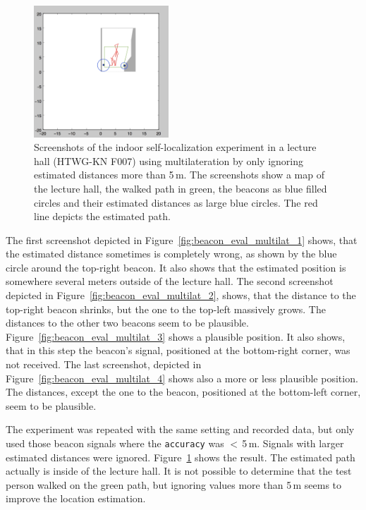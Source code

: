 \begin{figure}
	\includegraphics[width=0.45\textwidth]{figures/multilat_less5m}
	\caption{Screenshots of the indoor self-localization experiment in a lecture hall (HTWG-KN F007) using multilateration by only ignoring estimated distances more than 5\,m. The screenshots show a map of the lecture hall, the walked path in green, the beacons as blue filled circles and their estimated distances as large blue circles. The red line depicts the estimated path.}
	\label{fig:beacon_eval_multilat_less5m}
\end{figure}

The first screenshot depicted in Figure~\ref{fig:beacon_eval_multilat_1} shows, that the estimated distance sometimes is completely wrong, as shown by the blue circle around the top-right beacon. It also shows that the estimated position is somewhere several meters outside of the lecture hall. The second screenshot depicted in Figure~\ref{fig:beacon_eval_multilat_2}, shows, that the distance to the top-right beacon shrinks, but the one to the top-left massively grows. The distances to the other two beacons seem to be plausible. Figure~\ref{fig:beacon_eval_multilat_3} shows a plausible position. It also shows, that in this step the beacon's signal, positioned at the bottom-right corner, was not received. The last screenshot, depicted in Figure~\ref{fig:beacon_eval_multilat_4} shows also a more or less plausible position. The distances, except the one to the beacon, positioned at the bottom-left corner, seem to be plausible.

The experiment was repeated with the same setting and recorded data, but only used those beacon signals where the \texttt{accuracy} was $<$\,5\,m. Signals with larger estimated distances were ignored. Figure~\ref{fig:beacon_eval_multilat_less5m} shows the result. The estimated path actually is inside of the lecture hall. It is not possible to determine that the test person walked on the green path, but ignoring values more than 5\,m seems to improve the location estimation.

